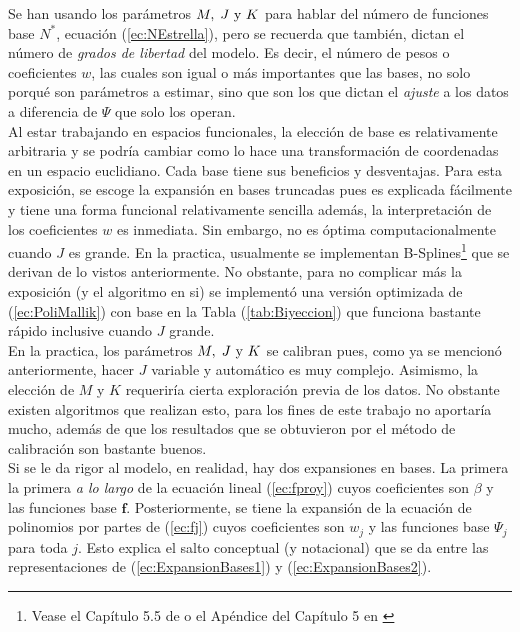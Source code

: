 \documentclass[../Main/Main.tex]{subfiles}
\begin{document}
Se han usando los parámetros $M,\;J\text{ y }K$ para hablar del número de funciones base $N^*$, ecuación (\ref{ec:NEstrella}), pero se recuerda que también, dictan el número de \textit{grados de libertad} del modelo. Es decir, el número de pesos o coeficientes $w$, las cuales son igual o más importantes que las bases, no solo porqué son parámetros a estimar, sino que son los que dictan el \textit{ajuste} a los datos a diferencia de $\Psi$ que solo los operan.\\

Al estar trabajando en espacios funcionales, la elección de base es relativamente arbitraria y se podría cambiar como lo hace una transformación de coordenadas en un espacio euclidiano. Cada base tiene sus beneficios y desventajas. Para esta exposición, se escoge la expansión en bases truncadas pues es explicada fácilmente y tiene una forma funcional relativamente sencilla además, la interpretación de los coeficientes $w$ es inmediata. Sin embargo, no es óptima computacionalmente cuando $J$ es grande. En la practica, usualmente se implementan B-Splines\footnote{Vease el Capítulo 5.5 de \autocite{wasserman2007all} o el Apéndice del Capítulo 5 en \autocite{hastie2008elements}} que se derivan de lo vistos anteriormente. No obstante, para no complicar más la exposición (y el algoritmo en si) se implementó una versión optimizada de (\ref{ec:PoliMallik}) con base en la Tabla (\ref{tab:Biyeccion}) que funciona bastante rápido inclusive cuando $J$ grande.\\

En la practica, los parámetros $M,\;J\text{ y }K$ se calibran pues, como ya se mencionó anteriormente, hacer $J$ variable y automático es muy complejo. Asimismo, la elección de $M$ y $K$ requeriría cierta exploración previa de los datos. No obstante existen algoritmos que realizan esto, para los fines de este trabajo no aportaría mucho, además de que los resultados que se obtuvieron por el método de calibración son bastante buenos.\\

Si se le da rigor al modelo, en realidad, hay dos expansiones en bases. La primera la primera \textit{a lo largo} de la ecuación lineal (\ref{ec:fproy}) cuyos coeficientes son $\beta$ y las funciones base $\mathbf{f}$. Posteriormente, se tiene la expansión de la ecuación de polinomios por partes de (\ref{ec:fj}) cuyos coeficientes son $w_j$ y las funciones base $\Psi_j$ para toda $j$. Esto explica el salto conceptual (y notacional) que se da entre las representaciones de (\ref{ec:ExpansionBases1}) y (\ref{ec:ExpansionBases2}).\\
\end{document}
